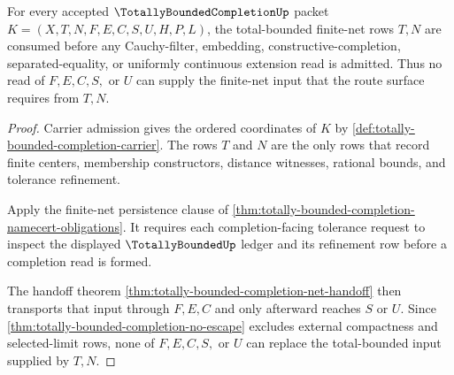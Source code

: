 \begin{theorem}
\label{thm:totally-bounded-completion-total-bounded-input-admission}
For every accepted $\TotallyBoundedCompletionUp$ packet $K=(X,T,N,F,E,C,S,U,H,P,L)$, the total-bounded finite-net rows $T,N$ are consumed before any Cauchy-filter, embedding, constructive-completion, separated-equality, or uniformly continuous extension read is admitted. Thus no read of $F,E,C,S,$ or $U$ can supply the finite-net input that the route surface requires from $T,N$.
\end{theorem}
\begin{proof}
Carrier admission gives the ordered coordinates of $K$ by \autoref{def:totally-bounded-completion-carrier}. The rows $T$ and $N$ are the only rows that record finite centers, membership constructors, distance witnesses, rational bounds, and tolerance refinement.

Apply the finite-net persistence clause of \autoref{thm:totally-bounded-completion-namecert-obligations}. It requires each completion-facing tolerance request to inspect the displayed $\TotallyBoundedUp$ ledger and its refinement row before a completion read is formed.

The handoff theorem \autoref{thm:totally-bounded-completion-net-handoff} then transports that input through $F,E,C$ and only afterward reaches $S$ or $U$. Since \autoref{thm:totally-bounded-completion-no-escape} excludes external compactness and selected-limit rows, none of $F,E,C,S,$ or $U$ can replace the total-bounded input supplied by $T,N$.
\end{proof}

